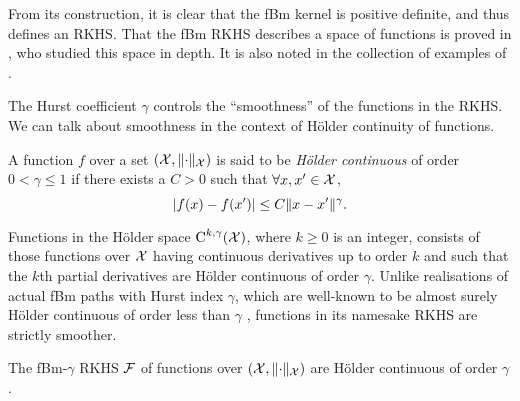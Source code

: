 \documentclass[a4paper,showframe,11pt,draft]{report}
\begin{document}
From its construction, it is clear that the fBm kernel is positive definite, and thus defines an RKHS.
That the fBm RKHS describes a space of functions is proved in \citet{cohen2002}, who studied this space in depth. 
It is also noted in the collection of examples of \citet[pp.71 \& 319]{berlinet2011reproducing}.

The Hurst coefficient $\gamma$ controls the ``smoothness'' of the functions in the RKHS. 
We can talk about smoothness in the context of Hölder continuity of functions.

\begin{definition}
  A function $f$ over a set $({\mathcal X}, \lVert\cdot\rVert_{\mathcal X})$ is said to be \emph{Hölder continuous} of order $0 <\gamma\leq 1$ if there exists a $C>0$ such that $\forall x,x'\in{\mathcal X}$,
  \[
    \vert f(x) - f(x') \vert \leq C \lVert x-x'\rVert^\gamma.
  \]
\end{definition}

Functions in the Hölder space $\text{C}^{k,\gamma}({\mathcal X})$, where $k\geq 0$ is an integer, consists of those functions over ${\mathcal X}$ having continuous derivatives up to order $k$ and such that the $k$th partial derivatives are Hölder continuous of order $\gamma$.
Unlike realisations of actual fBm paths with Hurst index $\gamma$, which are well-known to be almost surely Hölder continuous of order less than $\gamma$ \citep[Theorem 4.1.1]{embrechts2002selfsimilar}, functions in its namesake RKHS are strictly smoother.


\begin{claim}
  The fBm-$\gamma$ RKHS ${\mathcal F}$ of functions over $({\mathcal X}, \lVert\cdot\rVert_{\mathcal X})$ are Hölder continuous of order $\gamma$.
\end{claim}
\end{document}
